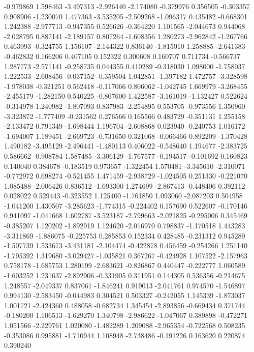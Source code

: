-0.979869
1.598463
-3.497313
-2.926440
-2.174080
-0.379976
0.356505
-0.303357
0.908906
-1.230070
1.477363
-3.535205
-2.509268
-1.096317
0.435482
-0.668301
1.242388
-2.977713
-0.947355
0.526626
-0.364220
1.101565
-2.044673
0.944068
-2.028795
0.887141
-2.189157
0.807264
-1.608356
1.280273
-2.962842
-1.267766
0.463993
-0.324755
1.156107
-2.144322
0.836140
-1.815010
1.258885
-2.641383
-0.462832
0.166206
0.407105
0.152322
0.300608
0.160707
0.711734
-0.566737
1.287773
-2.571141
-0.258735
0.044355
0.410289
-0.318030
1.098000
-1.758037
1.222533
-2.608456
-0.037152
-0.359504
1.042851
-1.397182
1.472757
-3.328598
-1.978038
-0.321251
0.562418
-0.117066
0.806062
-1.042745
1.669979
-3.268455
-2.455179
-1.282150
0.540225
-0.807600
1.422587
-3.161019
-1.132427
0.522624
-0.314978
1.240982
-1.807093
0.837983
-2.254895
0.553705
-0.973556
1.350960
-3.323872
-1.777409
-0.231562
0.276566
0.165566
0.483729
-0.351131
1.255158
-2.133472
0.791349
-1.698444
1.196704
-2.608868
0.023940
-0.240753
1.016172
-1.694007
1.189451
-2.669723
-0.731650
0.321068
-0.066466
0.892209
-1.370428
1.490182
-3.495129
-2.496441
-1.480113
0.406022
-0.548640
1.194677
-2.383725
0.586662
-0.908784
1.587485
-3.306129
-1.767577
-0.194517
-0.101692
0.160823
0.140040
0.384678
-0.183519
0.973657
-1.322454
1.570481
-3.345610
-2.310071
-0.772972
0.698274
-0.521455
1.471459
-2.938729
-1.024505
0.251330
-0.221070
1.085488
-2.006426
0.836512
-1.693300
1.274699
-2.867413
-0.448406
0.392112
0.028022
0.529443
-0.323552
1.125400
-1.761850
1.093060
-2.087203
0.504958
-1.041200
1.430507
-3.285623
-1.774315
-0.224402
0.157690
0.522607
-0.170146
0.941097
-1.041668
1.602787
-3.523187
-2.799663
-2.021825
-0.295006
0.345469
-0.385207
1.120202
-1.892919
1.124620
-2.016970
0.798837
-1.170518
1.443283
-3.311869
-1.886075
-0.225753
0.285853
0.152334
0.428485
-0.231312
0.945289
-1.507739
1.533673
-3.431181
-2.104474
-0.422878
0.456459
-0.254266
1.251140
-1.795392
1.319680
-3.029427
-1.035821
0.367267
-0.424928
1.107522
-2.157963
0.758178
-1.685753
1.280199
-2.683621
-0.826867
0.440447
-0.222777
1.060589
-1.603252
1.231637
-2.892906
-0.331905
0.311951
0.144305
0.536356
-0.214675
1.248557
-2.049337
0.837061
-1.846241
0.919013
-2.041761
0.974570
-1.546897
0.994130
-2.583450
-0.044983
0.304521
0.503327
-0.242055
1.145339
-1.873037
1.001721
-2.424360
0.488058
-0.682734
1.345454
-2.893856
-0.669434
0.371744
-0.180200
1.106513
-1.629270
1.340798
-2.986622
-1.047067
0.389898
-0.472271
1.051566
-2.229761
1.020080
-1.482289
1.209088
-2.965354
-0.722568
0.508235
-0.353086
0.995881
-1.710944
1.108948
-2.738486
-0.191226
0.163620
0.220874
0.390240

